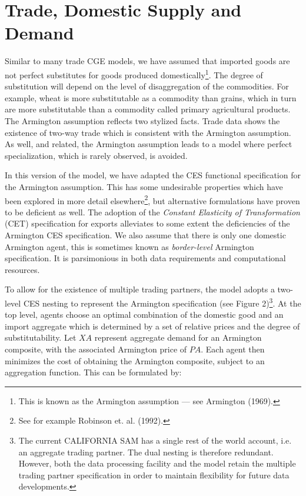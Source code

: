 \documentclass{article}
\begin{document}
\section{Trade, Domestic Supply and Demand}

Similar to many trade CGE models, we have assumed that imported goods are not perfect substitutes for goods produced domestically\footnote{This is known as the Armington assumption — see Armington (1969).}. The degree of substitution will depend on the level of disaggregation of the commodities. For example, wheat is more substitutable as a commodity than grains, which in turn are more substitutable than a commodity called primary agricultural products. The Armington assumption reflects two stylized facts. Trade data shows the existence of two-way trade which is consistent with the Armington assumption. As well, and related, the Armington assumption leads to a model where perfect specialization, which is rarely observed, is avoided.

In this version of the model, we have adapted the CES functional specification for the Armington assumption. This has some undesirable properties which have been explored in more detail elsewhere\footnote{See for example Robinson et. al. (1992).}, but alternative formulations have proven to be deficient as well. The adoption of the \textit{Constant Elasticity of Transformation} (CET) specification for exports alleviates to some extent the deficiencies of the Armington CES specification. We also assume that there is only one domestic Armington agent, this is sometimes known as \textit{border-level} Armington specification. It is parsimonious in both data requirements and computational resources.

To allow for the existence of multiple trading partners, the model adopts a two-level CES nesting to represent the Armington specification (see Figure 2)\footnote{The current CALIFORNIA SAM has a single rest of the world account, i.e. an aggregate trading partner. The dual nesting is therefore redundant. However, both the data processing facility and the model retain the multiple trading partner specification in order to maintain flexibility for future data developments.}. At the top level, agents choose an optimal combination of the domestic good and an import aggregate which is determined by a set of relative prices and the degree of substitutability. Let $XA$ represent aggregate demand for an Armington composite, with the associated Armington price of $PA$. Each agent then minimizes the cost of obtaining the Armington composite, subject to an aggregation function. This can be formulated by:
\end{document}
